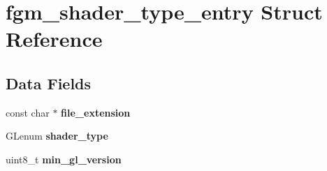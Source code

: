 \hypertarget{structfgm__shader__type__entry}{\section{fgm\-\_\-shader\-\_\-type\-\_\-entry Struct Reference}
\label{structfgm__shader__type__entry}
}
\subsection*{Data Fields}
\begin{DoxyCompactItemize}
\item 
\hypertarget{structfgm__shader__type__entry_aa791049c2d92639c7eba150285d314a2}{const char $\ast$ {\bfseries file\-\_\-extension}}\label{structfgm__shader__type__entry_aa791049c2d92639c7eba150285d314a2}

\item 
\hypertarget{structfgm__shader__type__entry_a6ecd2bb69be49987dbc0791751d93be7}{G\-Lenum {\bfseries shader\-\_\-type}}\label{structfgm__shader__type__entry_a6ecd2bb69be49987dbc0791751d93be7}

\item 
\hypertarget{structfgm__shader__type__entry_a3e6b207b6c4b79ec613475438023ba60}{uint8\-\_\-t {\bfseries min\-\_\-gl\-\_\-version}}\label{structfgm__shader__type__entry_a3e6b207b6c4b79ec613475438023ba60}

\end{DoxyCompactItemize}


